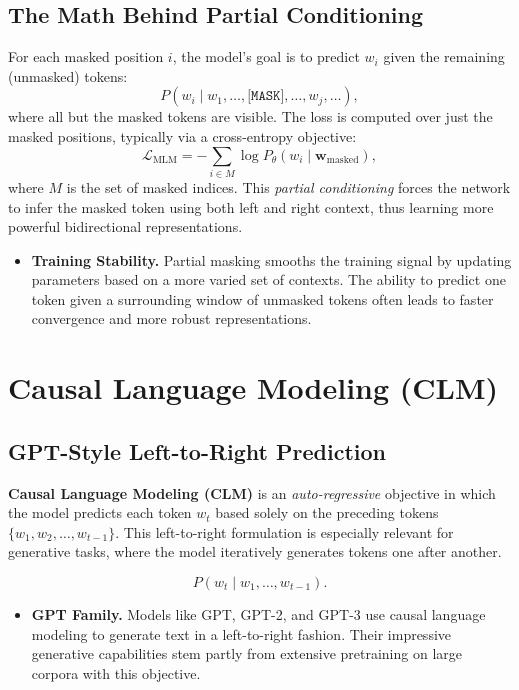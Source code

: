 \subsection{The Math Behind Partial Conditioning}
\noindent
For each masked position \(i\), the model’s goal is to predict \(w_i\) given the remaining (unmasked) tokens:
\[
P(w_i \mid w_1, \ldots, \texttt{[MASK]}, \ldots, w_{j}, \ldots),
\]
where all but the masked tokens are visible. The loss is computed over just the masked positions, typically via a cross-entropy objective:
\[
\mathcal{L}_\text{MLM} = - \sum_{i \in M} \log P_{\theta}(w_i \mid \mathbf{w}_{\text{masked}}),
\]
where \(M\) is the set of masked indices. This \emph{partial conditioning} forces the network to infer the masked token using both left and right context, thus learning more powerful bidirectional representations.

\begin{itemize}
    \item \textbf{Training Stability.}
    Partial masking smooths the training signal by updating parameters based on a more varied set of contexts. The ability to predict one token given a surrounding window of unmasked tokens often leads to faster convergence and more robust representations.
\end{itemize}


\section{Causal Language Modeling (CLM)}
\label{sec:clm}

\subsection{GPT-Style Left-to-Right Prediction}
\noindent
\textbf{Causal Language Modeling (CLM)} is an \emph{auto-regressive} objective in which the model predicts each token \(w_t\) based solely on the preceding tokens \(\{w_1, w_2, \ldots, w_{t-1}\}\). This left-to-right formulation is especially relevant for generative tasks, where the model iteratively generates tokens one after another.

\[
P(w_t \mid w_1, \ldots, w_{t-1}).
\]
\begin{itemize}
    \item \textbf{GPT Family.}
    Models like GPT, GPT-2, and GPT-3 use causal language modeling to generate text in a left-to-right fashion. Their impressive generative capabilities stem partly from extensive pretraining on large corpora with this objective.
\end{itemize}

